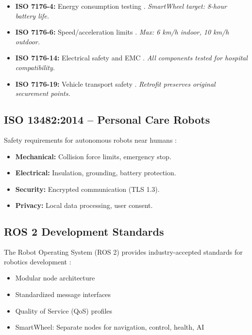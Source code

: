 \documentclass[12pt,a4paper]{report}
\begin{document}
\begin{itemize}
    \item \textbf{ISO 7176-4:} Energy consumption testing \cite{iso7176_4}. \textit{SmartWheel target: 8-hour battery life.}
    \item \textbf{ISO 7176-6:} Speed/acceleration limits \cite{iso7176_6}. \textit{Max: 6 km/h indoor, 10 km/h outdoor.}
    \item \textbf{ISO 7176-14:} Electrical safety and EMC \cite{iso7176_14}. \textit{All components tested for hospital compatibility.}
    \item \textbf{ISO 7176-19:} Vehicle transport safety \cite{iso7176_19}. \textit{Retrofit preserves original securement points.}
\end{itemize}

\subsection{ISO 13482:2014 -- Personal Care Robots}

Safety requirements for autonomous robots near humans \cite{iso13482}:
\begin{itemize}
    \item \textbf{Mechanical:} Collision force limits, emergency stop.
    \item \textbf{Electrical:} Insulation, grounding, battery protection.
    \item \textbf{Security:} Encrypted communication (TLS 1.3).
    \item \textbf{Privacy:} Local data processing, user consent.
\end{itemize}

\subsection{ROS 2 Development Standards}

The Robot Operating System (ROS 2) provides industry-accepted standards for robotics development \cite{ros2}:
\begin{itemize}
    \item Modular node architecture
    \item Standardized message interfaces
    \item Quality of Service (QoS) profiles
    \item SmartWheel: Separate nodes for navigation, control, health, AI
\end{itemize}
\end{document}
